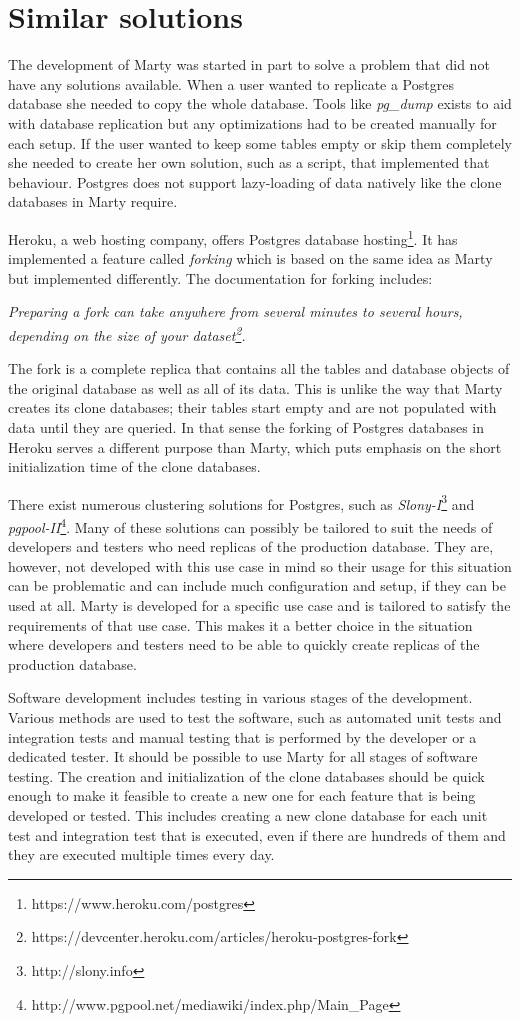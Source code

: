 \section{Similar solutions}
The development of Marty was started in part to solve a problem that did not have any solutions available.
When a user wanted to replicate a Postgres database she needed to copy the whole database.
Tools like \textit{pg\_dump} exists to aid with database replication but any optimizations had to be created manually for each setup.
If the user wanted to keep some tables empty or skip them completely she needed to create her own solution, such as a script, that implemented that behaviour.
Postgres does not support lazy-loading of data natively like the clone databases in Marty require.

Heroku, a web hosting company, offers Postgres database hosting\footnote{https://www.heroku.com/postgres}.
It has implemented a feature called \textit{forking} which is based on the same idea as Marty but implemented differently.
The documentation for forking includes:

\textit{Preparing a fork can take anywhere from several minutes to several hours, depending on the size of your dataset\footnote{https://devcenter.heroku.com/articles/heroku-postgres-fork}.}

The fork is a complete replica that contains all the tables and database objects of the original database as well as all of its data.
This is unlike the way that Marty creates its clone databases; their tables start empty and are not populated with data until they are queried.
In that sense the forking of Postgres databases in Heroku serves a different purpose than Marty, which puts emphasis on the short initialization time of the clone databases.

There exist numerous clustering solutions for Postgres, such as \textit{Slony-I}\footnote{http://slony.info} and \textit{pgpool-II}\footnote{http://www.pgpool.net/mediawiki/index.php/Main\_Page}.
Many of these solutions can possibly be tailored to suit the needs of developers and testers who need replicas of the production database.
They are, however, not developed with this use case in mind so their usage for this situation can be problematic and can include much configuration and setup, if they can be used at all.
Marty is developed for a specific use case and is tailored to satisfy the requirements of that use case.
This makes it a better choice in the situation where developers and testers need to be able to quickly create replicas of the production database.

Software development includes testing in various stages of the development.
Various methods are used to test the software, such as automated unit tests and integration tests and manual testing that is performed by the developer or a dedicated tester.
It should be possible to use Marty for all stages of software testing.
The creation and initialization of the clone databases should be quick enough to make it feasible to create a new one for each feature that is being developed or tested.
This includes creating a new clone database for each unit test and integration test that is executed, even if there are hundreds of them and they are executed multiple times every day.